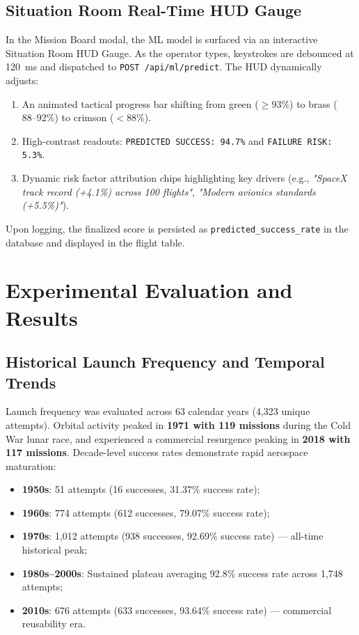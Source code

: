 \documentclass[10pt]{article}
\begin{document}
\subsection{Situation Room Real-Time HUD Gauge}
In the Mission Board modal, the ML model is surfaced via an interactive Situation Room HUD Gauge. As the operator types, keystrokes are debounced at 120~ms and dispatched to \texttt{POST /api/ml/predict}. The HUD dynamically adjusts:
\begin{enumerate}
    \item An animated tactical progress bar shifting from green ($\ge 93\%$) to brass ($88\text{--}92\%$) to crimson ($<88\%$).
    \item High-contrast readouts: \texttt{PREDICTED SUCCESS: 94.7\%} and \texttt{FAILURE RISK: 5.3\%}.
    \item Dynamic risk factor attribution chips highlighting key drivers (e.g., \textit{"SpaceX track record (+4.1\%) across 100 flights"}, \textit{"Modern avionics standards (+5.5\%)"}).
\end{enumerate}
Upon logging, the finalized score is persisted as \texttt{predicted\_success\_rate} in the database and displayed in the flight table.

\section{Experimental Evaluation and Results}

\subsection{Historical Launch Frequency and Temporal Trends}
Launch frequency was evaluated across 63 calendar years (4,323 unique attempts). Orbital activity peaked in \textbf{1971 with 119 missions} during the Cold War lunar race, and experienced a commercial resurgence peaking in \textbf{2018 with 117 missions}. Decade-level success rates demonstrate rapid aerospace maturation:
\begin{itemize}
    \item \textbf{1950s}: 51 attempts (16 successes, 31.37\% success rate);
    \item \textbf{1960s}: 774 attempts (612 successes, 79.07\% success rate);
    \item \textbf{1970s}: 1,012 attempts (938 successes, 92.69\% success rate) --- all-time historical peak;
    \item \textbf{1980s--2000s}: Sustained plateau averaging 92.8\% success rate across 1,748 attempts;
    \item \textbf{2010s}: 676 attempts (633 successes, 93.64\% success rate) --- commercial reusability era.
\end{itemize}
\end{document}
